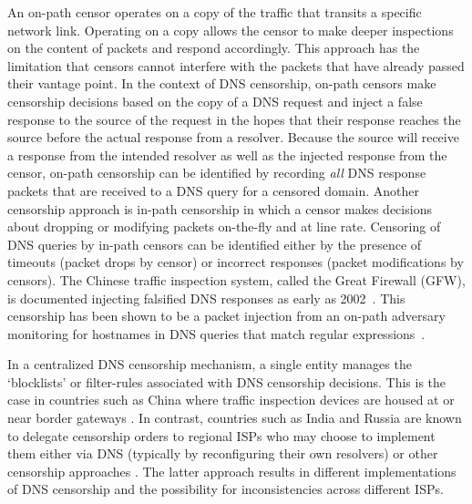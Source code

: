 An on-path censor operates on a copy of the traffic that transits a specific
network link. Operating on a copy allows the censor to make deeper inspections
on the content of packets and respond accordingly. This approach has the
limitation that censors cannot interfere with the packets that have already
passed their vantage point. In the context of DNS censorship, on-path censors
make censorship decisions based on the copy of a DNS request and inject a false
response to the source of the request in the hopes that their response reaches
the source before the actual response from a resolver. Because the source will
receive a response from the intended resolver as well as the injected response
from the censor, on-path censorship can be identified by recording {\em all}
DNS response packets that are received to a DNS query for a censored domain.
%
Another censorship approach is in-path censorship in which a censor makes
decisions about dropping or modifying packets on-the-fly and at line rate.
Censoring of DNS queries by in-path censors can be identified either by the
presence of timeouts (packet drops by censor) or incorrect responses (packet
modifications by censors).
%
The Chinese traffic inspection system, called the Great Firewall (GFW), is
documented injecting falsified DNS responses as early as
2002~\cite{global2002great}. This censorship has been shown to be a packet
injection from an on-path adversary monitoring for hostnames in DNS queries
that match regular expressions~\cite{USESEC21:GFWatch}.

In a centralized DNS censorship mechanism, a single entity manages the
`blocklists' or filter-rules associated with DNS censorship decisions. This is
the case in countries such as China where traffic inspection devices are housed
at or near border gateways \cite{xu2011internet}. In contrast, countries such
as India and Russia are known to delegate censorship orders to regional ISPs
who may choose to implement them either via DNS (typically by reconfiguring
their own resolvers) or other censorship approaches
\cite{ramesh2020decentralized, Yadav2018a}. The latter approach results in
different implementations of DNS censorship and the possibility for
inconsistencies across different ISPs. 

